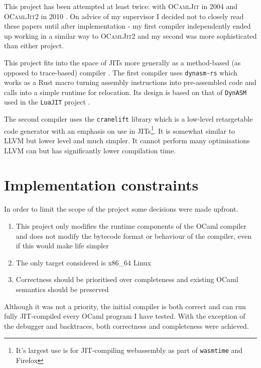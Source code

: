 This project has been attempted at least twice: with \textsc{OCamlJit} in 2004 \cite{ocjit1} and
\textsc{OCamlJit2} in 2010 \cite{ocjit2}. On advice of my supervisor I decided not to closely
read these papers until after implementation - my first compiler independently ended up working
in a similar way to \textsc{OCamlJit2} and my second was more sophisticated than either project.

This project fits into the space of JITs more generally as a method-based (as opposed to
trace-based) compiler \cite{pyket}. The first compiler uses \texttt{dynasm-rs} \cite{dynasmrs}
which works as a Rust macro turning assembly instructions into pre-assembled code and calls into
a simple runtime for relocation. Its design is based on that of \texttt{DynASM} used in the
\texttt{LuaJIT} project \cite{dynasm}.

The second compiler uses the \texttt{cranelift} \cite{cranelift} library which is a low-level
retargetable
code generator with an emphasis on use in JITs\footnote{It's largest use is for JIT-compiling
      webassembly as part of \texttt{wasmtime} and Firefox}. It is somewhat similar to LLVM but
lower
level and much simpler. It cannot perform many optimisations LLVM can but has significantly lower
compilation time.

\section{Implementation constraints}

In order to limit the scope of the project some decisions were made upfront.

\begin{enumerate}
      \item This project only modifies the runtime components of the OCaml compiler and does not
            modify the bytecode format or behaviour of the compiler, even if this would make life
            simpler
      \item The only target considered is x86\_64 Linux
      \item Correctness should be prioritised over completeness and existing OCaml semantics should
            be preserved
\end{enumerate}

Although it was not a priority, the initial compiler is both correct and can run fully
JIT-compiled every OCaml program I have tested. With the exception of the debugger and backtraces,
both correctness and completeness were achieved.

